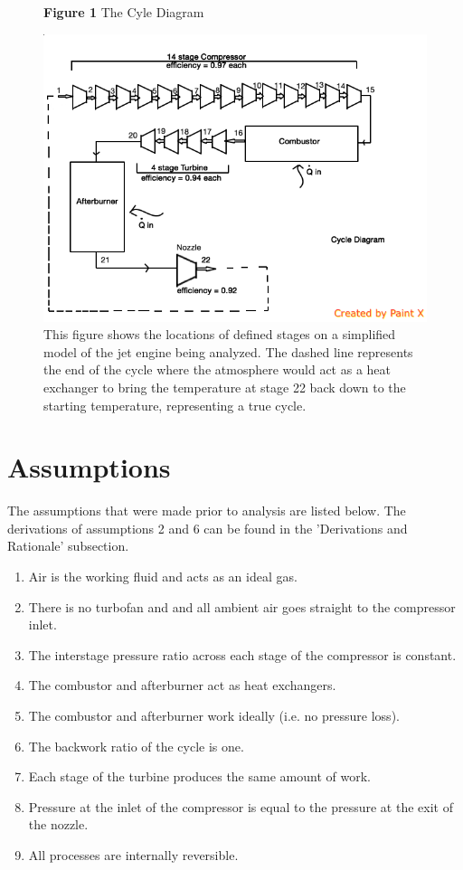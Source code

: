 \documentclass[11pt]{article} %
\begin{document}
\begin{figure}[h!]
\centering
  \textbf{Figure 1} The Cyle Diagram\par\medskip
  \includegraphics[scale=0.4]{cycle_diagram.png}
  \caption{This figure shows the locations of defined stages on a simplified model of the jet engine being analyzed. The dashed line represents the end of the cycle where the atmosphere would act as a heat exchanger to bring the temperature at stage 22 back down to the starting temperature, representing a true cycle.}
  \label{fig:cycle_diagram}
\end{figure}


\pagebreak
\section{Assumptions}

The assumptions that were made prior to analysis are listed below. The derivations of assumptions 2 and 6 can be found in the 'Derivations and Rationale' subsection.

\begin{enumerate}
\item Air is the working fluid and acts as an ideal gas.
\item There is no turbofan and and all ambient air goes straight to the compressor inlet.
\item The interstage pressure ratio across each stage of the compressor is constant.
\item The combustor and afterburner act as heat exchangers.
\item The combustor and afterburner work ideally (i.e. no pressure loss).
\item The backwork ratio of the cycle is one.
\item Each stage of the turbine produces the same amount of work.
\item Pressure at the inlet of the compressor is equal to the pressure at the exit of the nozzle.
\item All processes are internally reversible.
\end{enumerate}
\end{document}
